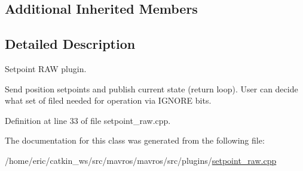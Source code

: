 \subsection*{Additional Inherited Members}


\subsection{Detailed Description}
Setpoint R\+AW plugin. 

Send position setpoints and publish current state (return loop). User can decide what set of filed needed for operation via I\+G\+N\+O\+RE bits. 

Definition at line 33 of file setpoint\+\_\+raw.\+cpp.



The documentation for this class was generated from the following file\+:\begin{DoxyCompactItemize}
\item 
/home/eric/catkin\+\_\+ws/src/mavros/mavros/src/plugins/\mbox{\hyperlink{setpoint__raw_8cpp}{setpoint\+\_\+raw.\+cpp}}\end{DoxyCompactItemize}
